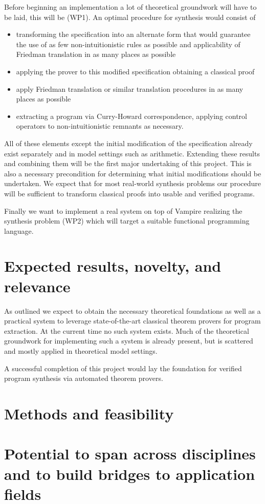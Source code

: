 \documentclass[a4paper,12pt]{article}
\begin{document}
	Before beginning an implementation a lot of theoretical groundwork will have to be laid, this will be (WP1). An optimal procedure for synthesis would consist of
	\begin{itemize}
		\item transforming the specification into an alternate form that would guarantee the use of as few non-intuitionistic rules as possible and applicability of Friedman translation in as many places as possible
		\item applying the prover to this modified specification obtaining a classical proof
		\item apply Friedman translation or similar translation procedures in as many places as possible
		\item extracting a program via Curry-Howard correspondence, applying control operators to non-intuitionistic remnants as necessary.
	\end{itemize}
	All of these elements except the initial modification of the specification already exist separately and in model settings such as arithmetic. Extending these results and combining them will be the first major undertaking of this project. This is also a necessary precondition for determining what initial modifications should be undertaken. We expect that for most real-world synthesis problems our procedure will be sufficient to transform classical proofs into usable and verified programs.
	
	Finally we want to implement a real system on top of Vampire realizing the synthesis problem (WP2) which will target a suitable functional programming language.
	
	\section{Expected results, novelty, and relevance}
	
	As outlined we expect to obtain the necessary theoretical foundations as well as a practical system to leverage state-of-the-art classical theorem provers for program extraction. At the current time no such system exists. Much of the theoretical groundwork for implementing such a system is already present, but is scattered and mostly applied in  theoretical model settings. 

	A successful completion of this project would lay the foundation for verified program synthesis via automated theorem provers.

	\section{Methods and feasibility}
	
	\section{Potential to span across disciplines and to build bridges to application fields}
	
	
	
	
\end{document}
